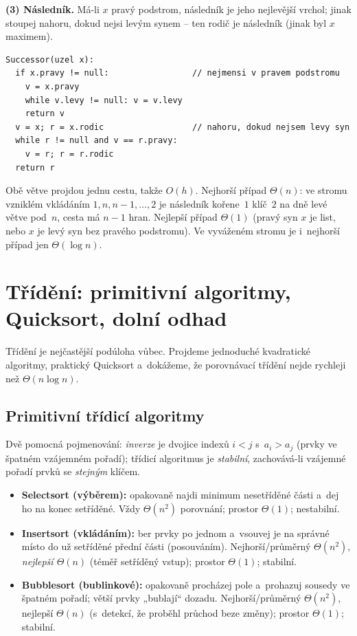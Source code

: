 \documentclass[11pt,a4paper]{article}
\begin{document}
\begin{priklad}
\textbf{(3) Následník.} Má-li $x$ pravý podstrom, následník je jeho nejlevější vrchol; jinak stoupej nahoru, dokud nejsi levým synem -- ten rodič je následník (jinak byl $x$ maximem).
\begin{lstlisting}
Successor(uzel x):
  if x.pravy != null:                 // nejmensi v pravem podstromu
    v = x.pravy
    while v.levy != null: v = v.levy
    return v
  v = x; r = x.rodic                  // nahoru, dokud nejsem levy syn
  while r != null and v == r.pravy:
    v = r; r = r.rodic
  return r
\end{lstlisting}
Obě větve projdou jednu cestu, takže $O(h)$. Nejhorší případ $\Theta(n)$: ve stromu vzniklém vkládáním $1,n,n-1,\dots,2$ je následník kořene~$1$ klíč~$2$ na dně levé větve pod~$n$, cesta má $n-1$ hran. Nejlepší případ $\Theta(1)$ (pravý syn $x$ je list, nebo $x$ je levý syn bez pravého podstromu). Ve vyváženém stromu je i~nejhorší případ jen $\Theta(\log n)$.
\end{priklad}

\section{Třídění: primitivní algoritmy, Quicksort, dolní odhad}

Třídění je nejčastější podúloha vůbec. Projdeme jednoduché kvadratické algoritmy, praktický Quicksort a~dokážeme, že porovnávací třídění nejde rychleji než $\Theta(n\log n)$.

\subsection{Primitivní třídicí algoritmy}

Dvě pomocná pojmenování: \emph{inverze} je dvojice indexů $i<j$ s~$a_i>a_j$ (prvky ve špatném vzájemném pořadí); třídicí algoritmus je \emph{stabilní}, zachovává-li vzájemné pořadí prvků se \emph{stejným} klíčem.

\begin{itemize}
  \item \textbf{Selectsort (výběrem):} opakovaně najdi minimum nesetříděné části a~dej ho na konec setříděné. Vždy $\Theta(n^2)$ porovnání; prostor $\Theta(1)$; nestabilní.
  \item \textbf{Insertsort (vkládáním):} ber prvky po jednom a~vsouvej je na správné místo do už setříděné přední části (posouváním). Nejhorší/průměrný $\Theta(n^2)$, \emph{nejlepší $\Theta(n)$} (téměř setříděný vstup); prostor $\Theta(1)$; stabilní.
  \item \textbf{Bubblesort (bublinkové):} opakovaně procházej pole a~prohazuj sousedy ve špatném pořadí; větší prvky „bublají`` dozadu. Nejhorší/průměrný $\Theta(n^2)$, nejlepší $\Theta(n)$ (s~detekcí, že proběhl průchod beze změny); prostor $\Theta(1)$; stabilní.
\end{itemize}
\end{document}
